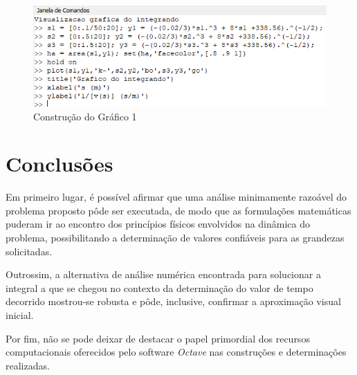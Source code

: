 \documentclass[a4paper, 12pt]{article}
\begin{document}
	\begin{figure}[H]
		\centering
		\includegraphics[scale=1]{img5.png}
		\caption{Construção do Gráfico 1}
	\end{figure}
	
	\section{Conclusões}
	
	Em primeiro lugar, é possível afirmar que uma análise minimamente razoável do problema proposto pôde ser executada,
	de modo que as formulações matemáticas puderam ir ao encontro dos princípios físicos envolvidos na dinâmica do problema,
	possibilitando a determinação de valores confiáveis para as grandezas solicitadas.
	
	Outrossim, a alternativa de análise numérica encontrada para solucionar a integral a que se chegou no contexto da 
	determinação do valor de tempo decorrido mostrou-se robusta e pôde, inclusive, confirmar a aproximação visual inicial.
	
	Por fim, não se pode deixar de destacar o papel primordial dos recursos computacionais oferecidos pelo software 
	\textit{Octave} nas construções e determinações realizadas. 	  
	
\end{document}
